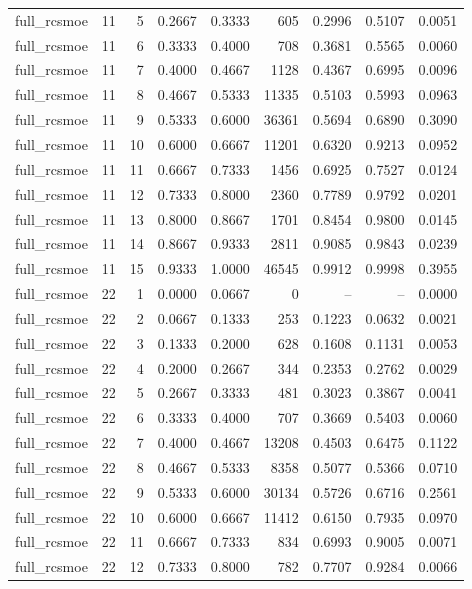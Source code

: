 \begin{tabular}{lrrrrrrrr}
full\_rcsmoe & 11 & 5 & 0.2667 & 0.3333 & 605 & 0.2996 & 0.5107 & 0.0051 \\
full\_rcsmoe & 11 & 6 & 0.3333 & 0.4000 & 708 & 0.3681 & 0.5565 & 0.0060 \\
full\_rcsmoe & 11 & 7 & 0.4000 & 0.4667 & 1128 & 0.4367 & 0.6995 & 0.0096 \\
full\_rcsmoe & 11 & 8 & 0.4667 & 0.5333 & 11335 & 0.5103 & 0.5993 & 0.0963 \\
full\_rcsmoe & 11 & 9 & 0.5333 & 0.6000 & 36361 & 0.5694 & 0.6890 & 0.3090 \\
full\_rcsmoe & 11 & 10 & 0.6000 & 0.6667 & 11201 & 0.6320 & 0.9213 & 0.0952 \\
full\_rcsmoe & 11 & 11 & 0.6667 & 0.7333 & 1456 & 0.6925 & 0.7527 & 0.0124 \\
full\_rcsmoe & 11 & 12 & 0.7333 & 0.8000 & 2360 & 0.7789 & 0.9792 & 0.0201 \\
full\_rcsmoe & 11 & 13 & 0.8000 & 0.8667 & 1701 & 0.8454 & 0.9800 & 0.0145 \\
full\_rcsmoe & 11 & 14 & 0.8667 & 0.9333 & 2811 & 0.9085 & 0.9843 & 0.0239 \\
full\_rcsmoe & 11 & 15 & 0.9333 & 1.0000 & 46545 & 0.9912 & 0.9998 & 0.3955 \\
full\_rcsmoe & 22 & 1 & 0.0000 & 0.0667 & 0 & -- & -- & 0.0000 \\
full\_rcsmoe & 22 & 2 & 0.0667 & 0.1333 & 253 & 0.1223 & 0.0632 & 0.0021 \\
full\_rcsmoe & 22 & 3 & 0.1333 & 0.2000 & 628 & 0.1608 & 0.1131 & 0.0053 \\
full\_rcsmoe & 22 & 4 & 0.2000 & 0.2667 & 344 & 0.2353 & 0.2762 & 0.0029 \\
full\_rcsmoe & 22 & 5 & 0.2667 & 0.3333 & 481 & 0.3023 & 0.3867 & 0.0041 \\
full\_rcsmoe & 22 & 6 & 0.3333 & 0.4000 & 707 & 0.3669 & 0.5403 & 0.0060 \\
full\_rcsmoe & 22 & 7 & 0.4000 & 0.4667 & 13208 & 0.4503 & 0.6475 & 0.1122 \\
full\_rcsmoe & 22 & 8 & 0.4667 & 0.5333 & 8358 & 0.5077 & 0.5366 & 0.0710 \\
full\_rcsmoe & 22 & 9 & 0.5333 & 0.6000 & 30134 & 0.5726 & 0.6716 & 0.2561 \\
full\_rcsmoe & 22 & 10 & 0.6000 & 0.6667 & 11412 & 0.6150 & 0.7935 & 0.0970 \\
full\_rcsmoe & 22 & 11 & 0.6667 & 0.7333 & 834 & 0.6993 & 0.9005 & 0.0071 \\
full\_rcsmoe & 22 & 12 & 0.7333 & 0.8000 & 782 & 0.7707 & 0.9284 & 0.0066 \\

\end{tabular}
